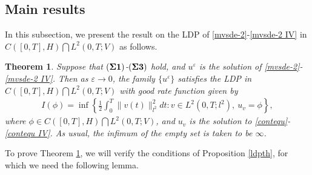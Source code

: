 \documentclass[11pt]{article}
\numberwithin{equation}{section}
\theoremstyle{plain}
\newtheorem{theorem}{Theorem}[section]
\begin{document}
 \subsection{Main results}

 In this subsection,
 we present the   result
 on   the LDP
 of  \eqref{mvsde-2}-\eqref{mvsde-2 IV} in
 $ C([0,T], H)  \bigcap  L^2(0,T; V) $
 as follows.



 \begin{theorem}\label{main}
    Suppose that $({\bf \Sigma 1})$-$({\bf \Sigma 3})$ hold,
    and $u^\varepsilon$ is the solution of \eqref{mvsde-2}-\eqref{mvsde-2 IV}.
    Then as $\varepsilon \rightarrow 0$, the family $\{ u^\varepsilon \}$
    satisfies the LDP in
    $ C([0,T], H)  \bigcap  L^2(0,T; V) $
    with   good rate function given by
    \begin{align}\label{rate}
        I(\phi)
        = \inf
        \left\{ \frac{1}{2} \int_{0}^{T}\| v(t) \|_{l^2}^2dt :
        v \in L^2(0,T; l^2),\  u_v = \phi
        \right\},
    \end{align}
    where
    $\phi \in C([0,T], H) \bigcap L^2(0,T; V)$,
    and $u_v$ is the solution to   \eqref{contequ}-\eqref{contequ IV}.
    As usual, the infimum of the empty set is taken to be $\infty$.
 \end{theorem}


 To prove
 Theorem \ref{main}, we will
 verify the conditions of Proposition \ref{ldpth},
 for which we need the following lemma.
\end{document}
